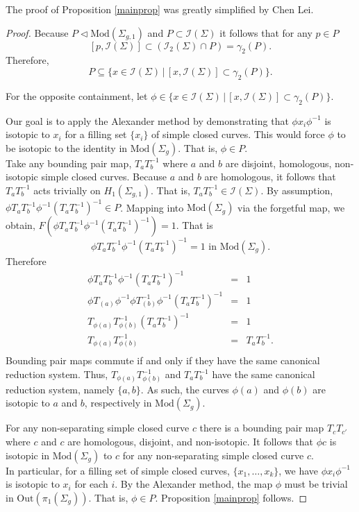 \documentclass[a4paper]{amsproc}
\theoremstyle{TheoremNum}
\theoremstyle{Theorembold}
\theoremstyle{TheoremboldDef}
\theoremstyle{TheoremboldRem}
\theoremstyle{TheoremboldRem}
\begin{document}
   The proof of Proposition \ref{mainprop} was greatly simplified by Chen Lei. 
     \begin{proof}  Because $P\triangleleft{\text{Mod}(\Sigma_{g,1})}$ and $P\subset{{\mathcal{I}}(\Sigma)}$ it follows that for any $p\in P$ \[[p,{{\mathcal{I}}(\Sigma)}]\subset ({{\mathcal{I}}_2(\Sigma)}\cap P)=\gamma_2(P).\] Therefore, \[P\subseteq \{x\in{{\mathcal{I}}(\Sigma)}\,|\, [x,{{\mathcal{I}}(\Sigma)}]\subset\gamma_2(P)\}.\]
   
  For the opposite containment, let $\phi\in\{x\in{{\mathcal{I}}(\Sigma)}\,|\, [x,{{\mathcal{I}}(\Sigma)}]\subset\gamma_2(P)\}$.
  
Our goal is to apply the Alexander method by demonstrating that  $\phi x_i\phi^{-1}$ is isotopic to $x_i$ for a filling set $\{x_i\}$ of simple closed curves. This would force $\phi$ to be isotopic to the identity in ${\text{Mod}(\Sigma_g)}$. That is, $\phi\in P$.\\
     
  
   Take any bounding pair map, $T_aT_b^{-1}$ where $a$ and $b$ are disjoint, homologous, non-isotopic simple closed curves. Because $a$ and $b$ are homologous, it follows that $T_aT_b^{-1}$ acts trivially on $H_1(\Sigma_{g,1})$. That is, $T_aT_b^{-1}\in {{\mathcal{I}}(\Sigma)}$.  By assumption, $\phi T_aT_b^{-1}\phi^{-1}(T_aT_b^{-1})^{-1}\in P$. Mapping into ${\text{Mod}(\Sigma_g)}$ via the forgetful map, we obtain, $F(\phi T_aT_b^{-1}\phi^{-1}(T_aT_b^{-1})^{-1})= 1$. That is \[\phi T_aT_b^{-1}\phi^{-1}(T_aT_b^{-1})^{-1}=1 \text{ in }{\text{Mod}(\Sigma_g)}.\] Therefore
  \begin{eqnarray*}
  \phi T_aT_b^{-1}\phi^{-1}(T_aT_b^{-1})^{-1}&=&1\\
   \phi T_{(a)}\phi^{-1} \phi T_{(b)}^{-1}\phi^{-1}(T_aT_b^{-1})^{-1}&=&1\\
  T_{\phi(a)}T_{\phi(b)}^{-1}(T_aT_b^{-1})^{-1}&=&1\\
   T_{\phi(a)}T_{\phi(b)}^{-1}&=& T_aT_b^{-1}.\\
  \end{eqnarray*}
  Bounding pair maps commute if and only if they have the same canonical reduction system. Thus, $ T_{\phi(a)}T_{\phi(b)}^{-1}$ and $ T_aT_b^{-1} $ have the same canonical reduction system, namely $\{a,b\}$. As such, the curves $\phi({a})$ and $\phi({b})$ are isotopic to $a$ and $b$, respectively in ${\text{Mod}(\Sigma_g)}$.
  
  For any non-separating simple closed curve $c$ there is a bounding pair map $T_c T_{c'}$ where $c$ and $c$ are homologous, disjoint, and non-isotopic. It follows that $\phi{c}$ is isotopic in ${\text{Mod}(\Sigma_g)}$ to $c$ for any non-separating simple closed curve $c$.\\ 
        
     In particular, for a filling set of simple closed curves, $\{x_1,\dots,x_k\}$, we have $\phi x_i\phi^{-1}$ is isotopic to $x_i$ for each $i$. By the Alexander method, the map $\phi$ must be trivial in $\text{Out}(\pi_1(\Sigma_g))$. That is, $\phi\in P$. Proposition \ref{mainprop} follows.  \end{proof} 
    
\end{document}

